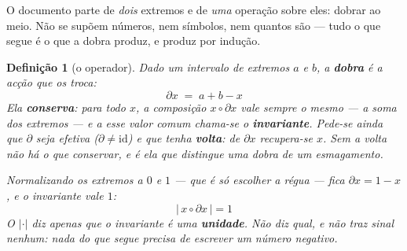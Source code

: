 \documentclass[11pt,a4paper]{article}
\newtheorem{definicao}[teorema]{Definição}
\begin{document}
\medskip\noindent O documento parte de \emph{dois} extremos e de \emph{uma}
operação sobre eles: dobrar ao meio. Não se supõem números, nem símbolos, nem
quantos são --- tudo o que segue é o que a dobra produz, e produz por indução.

\begin{definicao}[o operador]\label{def:op}
Dado um intervalo de extremos $a$ e $b$, a \textbf{dobra} é a acção que os
\emph{troca}:
\[
\boxed{\;\partial x \;=\; a+b-x\;}
\]
Ela \textbf{conserva}: para todo $x$, a composição $x\circ\partial x$ vale
sempre o mesmo --- a soma dos extremos --- e a esse valor comum chama-se o
\textbf{invariante}. Pede-se ainda que $\partial$ seja \emph{efetiva}
($\partial\neq\mathrm{id}$) e que tenha \textbf{volta}: de $\partial x$
recupera-se $x$. Sem a volta não há o que conservar, e é ela que distingue uma
dobra de um esmagamento.

\medskip\noindent Normalizando os extremos a $0$ e $1$ --- que é só escolher a
régua --- fica $\partial x=1-x$, e o invariante vale $1$:
\[
\boxed{\;|\,x\circ\partial x\,|=1\;}
\]
O $|\cdot|$ diz apenas que o invariante é uma \textbf{unidade}. Não diz qual, e
não traz sinal nenhum: nada do que segue precisa de escrever um número negativo.
\end{definicao}
\end{document}
